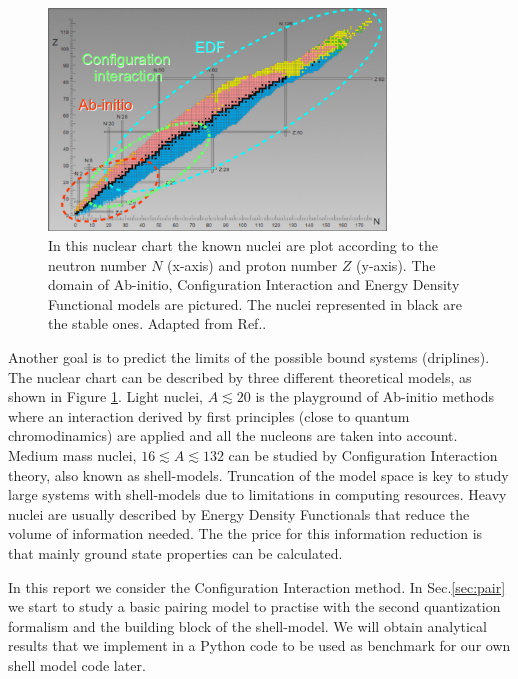 \documentclass[twoside]{article}
\begin{document}

\begin{figure}[ht]
\centering
\includegraphics[width=0.8\textwidth]{nuclear_chart.pdf}
\caption{In this nuclear chart the known nuclei are plot according to the neutron number $N$ (x-axis) and proton number $Z$ (y-axis). The domain of Ab-initio, Configuration Interaction and Energy Density Functional  models are pictured. The nuclei represented in black are the stable ones. Adapted from Ref.\cite{ref:KNCO}.}
\label{fig: nuclear_chart}
\end{figure}
Another goal is to predict the limits of the possible bound systems (driplines). The nuclear chart can be described by three different theoretical models, as shown in Figure \ref{fig: nuclear_chart}.
Light nuclei, $A \lesssim 20$ is the playground of Ab-initio methods where an interaction derived by first principles (close to quantum chromodinamics) are applied and all the nucleons are taken into account. Medium mass nuclei, $ 16 \lesssim A \lesssim 132$ can be studied by Configuration Interaction theory, also known as shell-models. Truncation of the model space is key to study large systems with shell-models due to limitations in computing resources. Heavy nuclei are usually described by Energy Density Functionals that reduce the volume of information needed. The the price for this information reduction is that mainly ground state properties can be calculated.

In this report we consider the Configuration Interaction method. In Sec.\ref{sec:pair} we start to study a basic pairing model to practise with the second quantization formalism and the building block of the shell-model. We will obtain analytical results that we implement in a Python code to be used as benchmark for our own shell model code later.
\end{document}
